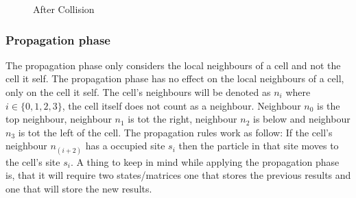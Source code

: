 \documentclass[a4paper,12pt]{article}
\begin{document}
\begin{figure}[H]
\begin{minipage}[width=0.5\linewidth]{0.5\textwidth}
  \caption{After Collision}
  \label{figure:collision_HPP2}
\end{minipage} 
\end{figure}
\subsubsection{Propagation phase}
The propagation phase only considers the local neighbours of a cell and not the cell it self. The propagation phase has no effect on the local neighbours of a cell, only on the cell it self. The cell's neighbours will be denoted as $n_i$ where $i \in \{0, 1, 2, 3\}$, the cell itself does not count as a neighbour. Neighbour $n_0$ is the top neighbour, neighbour $n_1$ is tot the right, neighbour $n_2$ is below and neighbour $n_3$ is tot the left of the cell. The propagation rules work as follow: If the cell's neighbour $n_{(i + 2)}$ has a occupied site $s_{i}$ then the particle in that site moves to the cell's
site $s_{i}$.
A thing to keep in mind while applying the propagation phase is, that it will require two states/matrices one that stores the previous results and one that will store the new results.
\end{document}
